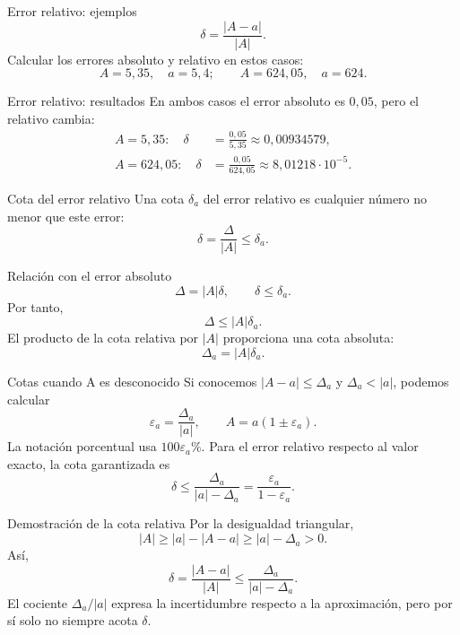 \documentclass[original_version/main.tex]{subfiles}
\begin{document}
\begin{frame}{Error relativo: ejemplos}
\[\delta=\frac{|A-a|}{|A|}.\]Calcular los errores absoluto y relativo en estos casos:\[A=5{,}35,\quad a=5{,}4;\qquad A=624{,}05,\quad a=624.\]
\end{frame}

\begin{frame}{Error relativo: resultados}
En ambos casos el error absoluto es $0{,}05$, pero el relativo cambia:\begin{align*}A=5{,}35:\quad\delta&=\frac{0{,}05}{5{,}35}\approx0{,}00934579,\\A=624{,}05:\quad\delta&=\frac{0{,}05}{624{,}05}\approx8{,}01218\cdot10^{-5}.\end{align*}
\end{frame}

\begin{frame}{Cota del error relativo}
Una cota $\delta_a$ del error relativo es cualquier número no menor que este error:\[\delta=\frac\Delta{|A|}\le\delta_a.\]
\end{frame}

\begin{frame}{Relación con el error absoluto}
\[\Delta=|A|\delta,\qquad\delta\le\delta_a.\]Por tanto,\[\Delta\le |A|\delta_a.\]El producto de la cota relativa por $|A|$ proporciona una cota absoluta:\[\Delta_a=|A|\delta_a.\]
\end{frame}

\begin{frame}{Cotas cuando A es desconocido}
\small Si conocemos $|A-a|\le\Delta_a$ y $\Delta_a<|a|$, podemos calcular\[\varepsilon_a=\frac{\Delta_a}{|a|},\qquad A=a(1\pm\varepsilon_a).\]La notación porcentual usa $100\varepsilon_a\%$. Para el error relativo respecto al valor exacto, la cota garantizada es\[\boxed{\delta\le\frac{\Delta_a}{|a|-\Delta_a}=\frac{\varepsilon_a}{1-\varepsilon_a}.}\]
\end{frame}

\begin{frame}{Demostración de la cota relativa}
Por la desigualdad triangular,\[|A|\ge |a|-|A-a|\ge |a|-\Delta_a>0.\]Así,\[\delta=\frac{|A-a|}{|A|}\le\frac{\Delta_a}{|a|-\Delta_a}.\]El cociente $\Delta_a/|a|$ expresa la incertidumbre respecto a la aproximación, pero por sí solo no siempre acota $\delta$.
\end{frame}
\end{document}

